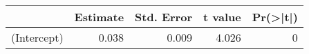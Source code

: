 
\begin{tabular}{l|r|r|r|r}
\hline
  & Estimate & Std. Error & t value & Pr(>|t|)\\
\hline
(Intercept) & 0.038 & 0.009 & 4.026 & 0\\
\hline
\end{tabular}
